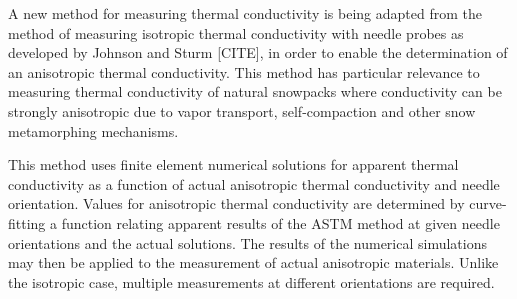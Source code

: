 A new method for measuring thermal conductivity is being adapted from the method
of measuring isotropic thermal conductivity with needle probes as developed by
Johnson and Sturm [CITE], in order to enable the determination of an anisotropic
thermal conductivity. This method has particular relevance to measuring thermal
conductivity of natural snowpacks where conductivity can be strongly anisotropic
due to vapor transport, self-compaction and other snow metamorphing mechanisms.

This method uses finite element numerical solutions for apparent thermal
conductivity as a function of actual anisotropic thermal conductivity and needle
orientation. Values for anisotropic thermal conductivity are determined by
curve-fitting a function relating apparent results of the ASTM method at given
needle orientations and the actual solutions. The results of the numerical
simulations may then be applied to the measurement of actual anisotropic
materials. Unlike the isotropic case, multiple measurements at different
orientations are required.

